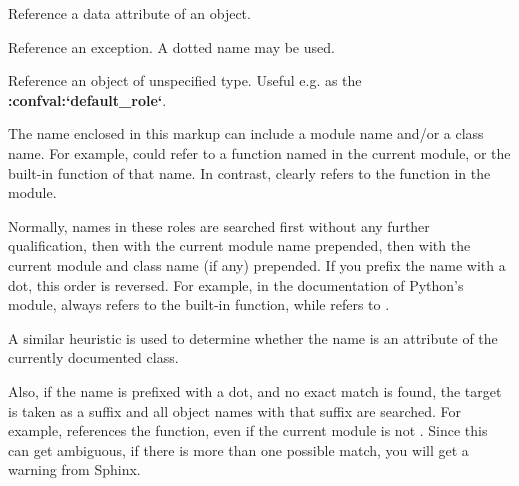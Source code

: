 \documentclass[letterpaper,10pt,english]{sphinxmanual}
\begin{document}

\begin{fulllineitems}
\label{domains:role-py:attr}
Reference a data attribute of an object.

\end{fulllineitems}


\begin{fulllineitems}
\label{domains:role-py:exc}
Reference an exception.  A dotted name may be used.

\end{fulllineitems}


\begin{fulllineitems}
\label{domains:role-py:obj}
Reference an object of unspecified type.  Useful e.g. as the
{\color{red}\bfseries{}:confval:{}`default\_role{}`}.


\end{fulllineitems}


The name enclosed in this markup can include a module name and/or a class name.
For example,  could refer to a function named  in
the current module, or the built-in function of that name.  In contrast,
 clearly refers to the  function in the
 module.

Normally, names in these roles are searched first without any further
qualification, then with the current module name prepended, then with the
current module and class name (if any) prepended.  If you prefix the name with a
dot, this order is reversed.  For example, in the documentation of Python's
 module,  always refers to the built-in
function, while  refers to .

A similar heuristic is used to determine whether the name is an attribute of the
currently documented class.

Also, if the name is prefixed with a dot, and no exact match is found, the
target is taken as a suffix and all object names with that suffix are
searched.  For example,  references the
 function, even if the current module is not
.  Since this can get ambiguous, if there is more than one possible
match, you will get a warning from Sphinx.
\end{document}
